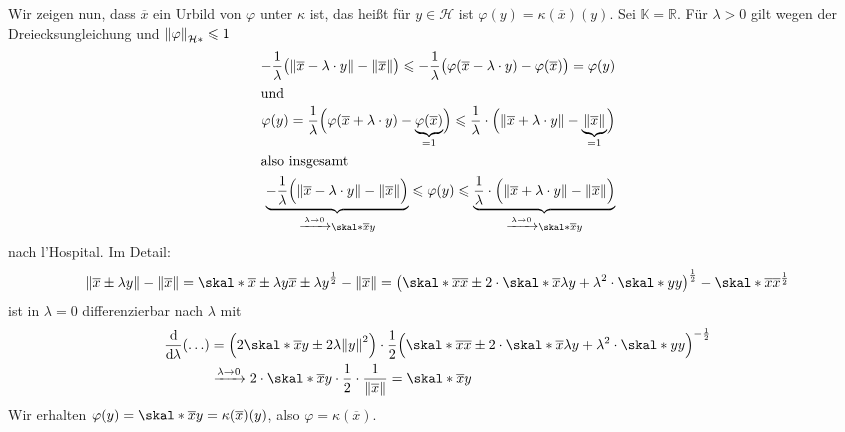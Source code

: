 \begin{enumerate}[(i)]
	Wir zeigen nun, dass $\overline{x}$ ein Urbild von $\varphi$ unter $\kappa$ ist, das heißt für $y \in \mathcal{H}$ ist $\varphi(y)= \kappa(\overline{x})(y)$. Sei 
	$\mathds{K}=\mathds{R}$. Für $\lambda>0$ gilt wegen der Dreiecksungleichung und $\norm[\mathcal{H}*]{\varphi}\le 1$
	\begin{align*}
		-\frac{1}{\lambda} \enbrace[\big]{\norm{\overline{x} - \lambda \cdot y } - \norm{\overline{x}}} \le -\frac{1}{\lambda} \enbrace[\big]{\varphi \enbrace*{\overline{x}- \lambda 
		\cdot y} - \varphi(\overline{x})} = \varphi(y) \\
		\shortintertext{und}
		\varphi(y) = \frac{1}{\lambda} \enbrace[\Big]{\varphi(\overline{x}+\lambda \cdot y) - \underbrace{\varphi(\overline{x})}_{=1}} 
		\le \frac{1}{\lambda} \cdot \enbrace[\Big]{\norm{\overline{x} + \lambda \cdot y } - \underbrace{\norm{\overline{x}}}_{=1} }    \\
		\shortintertext{also insgesamt}
		 \underbrace{-\frac{1}{\lambda} \enbrace[\Big]{\norm{\overline{x} - \lambda \cdot y } - \norm{\overline{x}}} }_{\xrightarrow{\lambda \to 0} \skal*{\overline{x}}{y}}
		 \le \varphi(y) 
		 \le \underbrace{\frac{1}{\lambda} \cdot \enbrace[\Big]{\norm{\overline{x} +\lambda\cdot y} - \norm{\overline{x}}}}_{\xrightarrow{\lambda \to 0} \skal*{\overline{x}}{y}}
	\end{align*}
	nach l'Hospital. Im Detail:
	\begin{align*}
		\norm{\overline{x} \pm \lambda y} - \norm{\overline{x}} = \skal*{\overline{x} \pm \lambda y }{\overline{x} \pm \lambda y }^{\frac{1}{2}} - \norm{\overline{x}}
		= \enbrace*{\skal*{\overline{x}}{\overline{x}} \pm 2 \cdot \skal*{\overline{x}}{\lambda y} + \lambda^2 \cdot \skal*{y}{y}}^{\frac{1}{2}} - 
		\skal*{\overline{x}}{\overline{x}}^{\frac{1}{2}}
	\end{align*}
	ist in $\lambda=0$ differenzierbar nach $\lambda$ mit 
	\begin{align*}
		\diffd{}{\lambda}(\ldots) &= \enbrace*{2 \skal*{\overline{x}}{y} \pm 2 \lambda \norm{y}^2} \cdot  
		\frac{1}{2} \enbrace[\Big]{\skal*{\overline{x}}{\overline{x}} \pm 2 \cdot \skal*{\overline{x}}{\lambda y} + \lambda^2 \cdot \skal*{y}{y}}^{-\frac{1}{2}} \\
		&\xrightarrow{\lambda \to 0} 2 \cdot \skal*{\overline{x}}{y} \cdot \frac{1}{2} \cdot \frac{1}{\norm{\overline{x}}} = \skal*{\overline{x}}{y}
	\end{align*}
	Wir erhalten $\varphi(y)= \skal*{\overline{x}}{y} = \kappa(\overline{x})(y)$, also $\varphi=\kappa(\overline{x})$. 
	

\end{enumerate}
